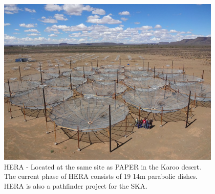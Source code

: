 \documentclass[a0,landscape]{a0poster}
\begin{document}
\begin{multicols}{4}
\begin{figure}[H]
\centering
\label{fig:HERA}
\includegraphics[width=0.8\linewidth]{figures/HERA19.png}
\caption{HERA - Located at the same site as PAPER in the Karoo desert. The current phase of HERA consists of 19 14m parabolic dishes. HERA is also a pathfinder project for the SKA.}
\end{figure}






\color{DarkSlateGray} %






\end{multicols}
\end{document}
